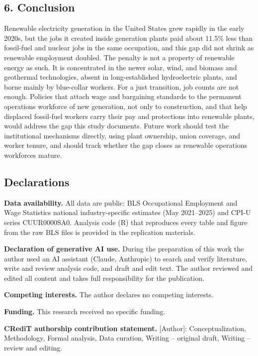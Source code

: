 \documentclass[
  11pt,
]{article}
\begin{document}
\subsection{6. Conclusion}\label{conclusion}

Renewable electricity generation in the United States grew rapidly in
the early 2020s, but the jobs it created inside generation plants paid
about 11.5\% less than fossil-fuel and nuclear jobs in the same
occupation, and this gap did not shrink as renewable employment doubled.
The penalty is not a property of renewable energy as such. It is
concentrated in the newer solar, wind, and biomass and geothermal
technologies, absent in long-established hydroelectric plants, and borne
mainly by blue-collar workers. For a just transition, job counts are not
enough. Policies that attach wage and bargaining standards to the
permanent operations workforce of new generation, not only to
construction, and that help displaced fossil-fuel workers carry their
pay and protections into renewable plants, would address the gap this
study documents. Future work should test the institutional mechanisms
directly, using plant ownership, union coverage, and worker tenure, and
should track whether the gap closes as renewable operations workforces
mature.

\subsection{Declarations}\label{declarations}

\textbf{Data availability.} All data are public: BLS Occupational
Employment and Wage Statistics national industry-specific estimates (May
2021--2025) and CPI-U series CUUR0000SA0. Analysis code (R) that
reproduces every table and figure from the raw BLS files is provided in
the replication materials.

\textbf{Declaration of generative AI use.} During the preparation of
this work the author used an AI assistant (Claude, Anthropic) to search
and verify literature, write and review analysis code, and draft and
edit text. The author reviewed and edited all content and takes full
responsibility for the publication.

\textbf{Competing interests.} The author declares no competing
interests.

\textbf{Funding.} This research received no specific funding.

\textbf{CRediT authorship contribution statement.} {[}Author{]}:
Conceptualization, Methodology, Formal analysis, Data curation, Writing
-- original draft, Writing -- review and editing.
\end{document}
